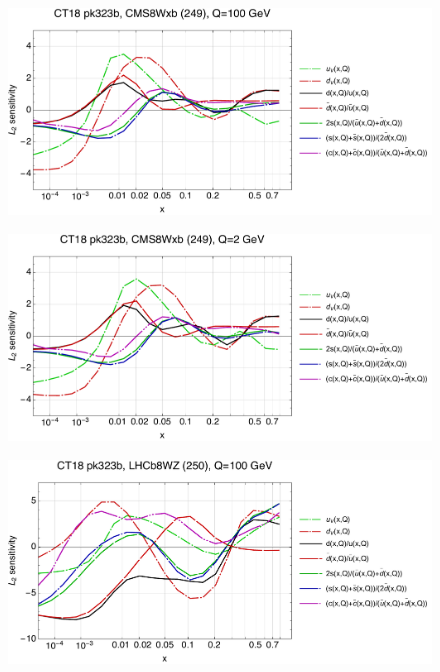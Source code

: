 \documentclass[10pt,aps,prd,floatfix,titlepage]{revtex4}
\begin{document}
\clearpage
\begin{figure}
\includegraphics[width=\textwidth,height=0.44\textheight,keepaspectratio]{2/249_ct18nn_q100_Sf_2.pdf}
\caption{}
\end{figure}
\begin{figure}
\includegraphics[width=\textwidth,height=0.44\textheight,keepaspectratio]{2/249_ct18nn_q2_Sf_2.pdf}
\caption{}
\end{figure}
\clearpage
\begin{figure}
\includegraphics[width=\textwidth,height=0.44\textheight,keepaspectratio]{2/250_ct18nn_q100_Sf_2.pdf}
\caption{}
\end{figure}
\end{document}
